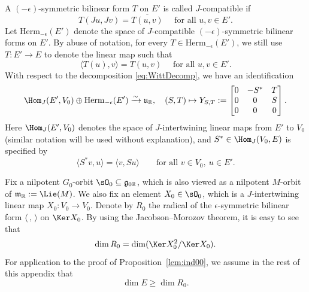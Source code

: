 \documentclass[11pt,a4paper]{amsart}
\newcommand{\R}{\mathbb R}
\newcommand{\la}{\langle}
\newcommand{\ra}{\rangle}
\newcommand{\be}{\begin {equation}}
\newcommand{\ee}{\end {equation}}
\numberwithin{equation}{section}
\theoremstyle{remark}
\def\subset{\subseteq}
\begin{document}
A $(-\epsilon)$-symmetric bilinear form $T$ on $E'$ is called $J$-compatible if 
\begin{equation} \label{hermep}
T(J u, Jv)=
  \overline{T(u,v)}\quad\textrm{  for all $u,v\in E'$}.
\end{equation}
Let $\mathrm{Herm}_{-\epsilon}(E')$ denote the space of  $J$-compatible  $(-\epsilon)$-symmetric  bilinear forms on $E'$.
By abuse of notation, for every $T\in \mathrm{Herm}_{-\epsilon}(E')$, we still use $T: E'\rightarrow E$ to denote the linear map such that
\[
  \langle T(u), v\rangle= T(u, v)\quad\textrm{  for all $u,v\in E'$.}
\]
With respect to the decomposition  \eqref{eq:WittDecomp}, we have an identification %
\begin{equation}\label{eq:YCB}
\Hom_J(E',V_0)\oplus\mathrm{Herm}_{-\epsilon}(E')\xrightarrow{\sim} \frak u_\R, \quad (S,T)\mapsto Y_{S,T}:=
\begin{bmatrix}
0&-S^* &T\\
0&0&S\\
0&0&0
\end{bmatrix}.
\end{equation}
Here $\Hom_J(E',V_0)$  denotes the space of $J$-intertwining linear maps
from $E'$ to $V_0$ (similar notation will be used without explanation), and 
 $S^*\in\Hom_J(V_0,E)$ is specified by
\begin{equation}\label{eq:Cvee}
\langle S^* v,u\rangle=\langle v,S u\rangle \qquad \textrm{for all } v\in V_0,\ u\in E'.
 \end{equation}





Fix a nilpotent $G_0$-orbit $\sO_0\subset\mathfrak g_{0\R}$, which is also viewed as a nilpotent $M$-orbit of $\mathfrak m_\R:=\Lie(M)$.  We also fix an element $X_0\in \sO_0$, which is a $J$-intertwining linear map $X_0: V_0\rightarrow V_0$. Denote by $R_0$   the radical of the $\epsilon$-symmetric bilinear form $\la\, ,\,\ra$ on $\Ker X_0$. 
By using the Jacobson–Morozov theorem, it is easy to see that 
\[
  \dim R_0=\dim(\Ker X_0^2/\Ker X_0).
\]
For application to the proof of Proposition~\ref{lem:ind00}, we assume in the rest of this appendix that \begin{equation}\label{eq:r-gd0}
\dim E\geq \dim R_0.
\end{equation}
\end{document}
